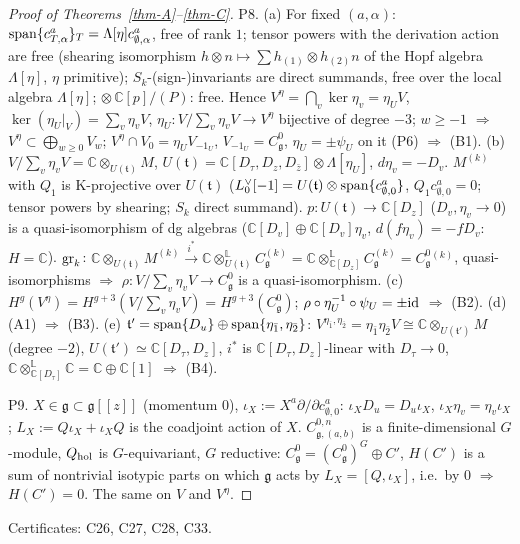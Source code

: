 \documentclass[10pt,a4paper]{article}
\numberwithin{equation}{section}
\theoremstyle{definition}
\theoremstyle{remark}
\newcommand{\g}{\mathfrak g}
\newcommand{\zb}{\bar z}
\newcommand{\Veta}{V^{\eta}}
\newcommand{\Cg}{C^0_{\g}}
\newcommand{\cert}[1]{\par\noindent\textup{Certificates: #1.}\par}
\begin{document}
\begin{proof}[Proof of Theorems~\ref{thm-A}--\ref{thm-C}]
P8. (a) For fixed $(a,\alpha)$: ${\rm span}\{c^a_{T,\alpha}\}_T=\Lambda[\eta]c^a_{\emptyset,\alpha}$, free of rank $1$; tensor powers with the derivation action are free (shearing isomorphism $h\otimes n\mapsto\sum h_{(1)}\otimes h_{(2)}n$ of the Hopf algebra $\Lambda[\eta]$, $\eta$ primitive); $S_k$-(sign-)invariants are direct summands, free over the local algebra $\Lambda[\eta]$; $\otimes\,\mathbb C[p]/(P)$: free. Hence $\Veta=\bigcap_v\ker\eta_v=\eta_UV$, $\ker(\eta_U|_V)=\sum_v\eta_vV$, $\eta_U:V/\sum_v\eta_vV\to\Veta$ bijective of degree $-3$; $w\ge-1$ $\Rightarrow$ $\Veta\subset\bigoplus_{w\ge0}V_w$; $\Veta\cap V_0=\eta_UV_{-1_U}$, $V_{-1_U}=\Cg$, $\eta_U=\pm\psi_U$ on it (P6) $\Rightarrow$ (B1).
(b) $V/\sum_v\eta_vV=\mathbb C\otimes_{U(\mathfrak t)}M$, $U(\mathfrak t)=\mathbb C[D_\tau,D_z,D_{\zb}]\otimes\Lambda[\eta_U]$, $d\eta_v=-D_v$. $M^{(k)}$ with $Q_1$ is K-projective over $U(\mathfrak t)$ ($L_0^\vee[-1]=U(\mathfrak t)\otimes{\rm span}\{c^a_{\emptyset,0}\}$, $Q_1c^a_{\emptyset,0}=0$; tensor powers by shearing; $S_k$ direct summand). $p:U(\mathfrak t)\to\mathbb C[D_z]$ ($D_v,\eta_v\to0$) is a quasi-isomorphism of dg algebras ($\mathbb C[D_v]\oplus\mathbb C[D_v]\eta_v$, $d(f\eta_v)=-fD_v$: $H=\mathbb C$). ${\rm gr}_k$: $\mathbb C\otimes_{U(\mathfrak t)}M^{(k)}\xrightarrow{i^*}\mathbb C\otimes^{\mathbb L}_{U(\mathfrak t)}C_\g^{(k)}=\mathbb C\otimes^{\mathbb L}_{\mathbb C[D_z]}C^{(k)}_\g=\Cg{}^{(k)}$, quasi-isomorphisms $\Rightarrow$ $\rho:V/\sum_v\eta_vV\to\Cg$ is a quasi-isomorphism.
(c) $H^g(\Veta)=H^{g+3}(V/\sum_v\eta_vV)=H^{g+3}(\Cg)$; $\rho\circ\eta_U^{-1}\circ\psi_U=\pm{\rm id}$ $\Rightarrow$ (B2). (d) (A1) $\Rightarrow$ (B3). (e) $\mathfrak t'={\rm span}\{D_u\}\oplus{\rm span}\{\eta_{\bar1},\eta_{\bar2}\}$: $V^{\eta_{\bar1},\eta_{\bar2}}=\eta_{\bar1}\eta_{\bar2}V\cong\mathbb C\otimes_{U(\mathfrak t')}M$ (degree $-2$), $U(\mathfrak t')\simeq\mathbb C[D_\tau,D_z]$, $i^*$ is $\mathbb C[D_\tau,D_z]$-linear with $D_\tau\to0$, $\mathbb C\otimes^{\mathbb L}_{\mathbb C[D_\tau]}\mathbb C=\mathbb C\oplus\mathbb C[1]$ $\Rightarrow$ (B4).

P9. $X\in\g\subset\g[[z]]$ (momentum $0$), $\iota_X:=X^a\partial/\partial c^a_{\emptyset,0}$: $\iota_XD_u=D_u\iota_X$, $\iota_X\eta_v=\eta_v\iota_X$; $L_X:=Q\iota_X+\iota_XQ$ is the coadjoint action of $X$. $C^{0,n}_{\g,(a,b)}$ is a finite-dimensional $G$-module, $Q_{\rm hol}$ is $G$-equivariant, $G$ reductive: $\Cg=(\Cg)^G\oplus C'$, $H(C')$ is a sum of nontrivial isotypic parts on which $\g$ acts by $L_X=[Q,\iota_X]$, i.e.\ by $0$ $\Rightarrow$ $H(C')=0$. The same on $V$ and $\Veta$.
\end{proof}
\cert{C26, C27, C28, C33}
\end{document}
